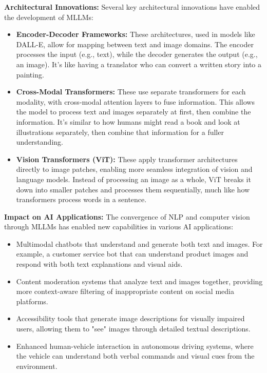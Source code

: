 \textbf{Architectural Innovations:}
Several key architectural innovations have enabled the development of MLLMs:

\begin{itemize}
    \item \textbf{Encoder-Decoder Frameworks:} These architectures, used in models like DALL-E, allow for mapping between text and image domains. The encoder processes the input (e.g., text), while the decoder generates the output (e.g., an image). It's like having a translator who can convert a written story into a painting.
    
    \item \textbf{Cross-Modal Transformers:} These use separate transformers for each modality, with cross-modal attention layers to fuse information. This allows the model to process text and images separately at first, then combine the information. It's similar to how humans might read a book and look at illustrations separately, then combine that information for a fuller understanding.
    
    \item \textbf{Vision Transformers (ViT):} These apply transformer architectures directly to image patches, enabling more seamless integration of vision and language models. Instead of processing an image as a whole, ViT breaks it down into smaller patches and processes them sequentially, much like how transformers process words in a sentence.
\end{itemize}


\textbf{Impact on AI Applications:}
The convergence of NLP and computer vision through MLLMs has enabled new capabilities in various AI applications:

\begin{itemize}
    \item Multimodal chatbots that understand and generate both text and images. For example, a customer service bot that can understand product images and respond with both text explanations and visual aids.
    \item Content moderation systems that analyze text and images together, providing more context-aware filtering of inappropriate content on social media platforms.
    \item Accessibility tools that generate image descriptions for visually impaired users, allowing them to "see" images through detailed textual descriptions.
    \item Enhanced human-vehicle interaction in autonomous driving systems, where the vehicle can understand both verbal commands and visual cues from the environment.
\end{itemize}

